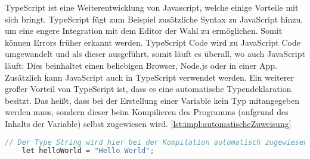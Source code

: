 TypeScript ist eine Weiterentwicklung von Javascript, welche einige Vorteile mit sich bringt. TypeScript fügt zum Beispiel zusätzliche Syntax zu JavaScript hinzu, um eine engere Integration mit dem Editor der Wahl zu ermöglichen. Somit können Errors früher erkannt werden. TypeScript Code wird zu JavaScript Code umgewandelt und als dieser ausgeführt, somit läuft es überall, wo auch JavaScript läuft: Dies beinhaltet einen beliebigen Browser, Node.js oder in einer App. Zusätzlich kann JavaScript auch in TypeScript verwendet werden. Ein weiterer großer Vorteil von TypeScript ist, dass es eine automatische Typendeklaration besitzt. Das heißt, dass bei der Erstellung einer Variable kein Typ mitangegeben werden muss, sondern dieser beim Kompilieren des Programms (aufgrund des Inhalts der Variable) selbst zugewiesen wird. \ref{lst:impl:automatischeZuweisung}
 
\begin{lstlisting}[language=java,caption=TypeScript automatische Zuweisung,label=lst:impl:automatischeZuweisung]
    // Der Type String wird hier bei der Kompilation automatisch zugewiesen
    let helloWorld = "Hello World";
\end{lstlisting}